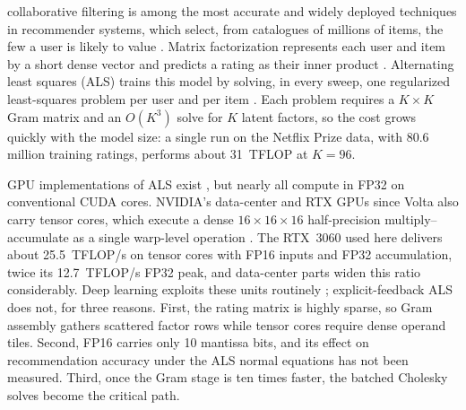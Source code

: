 
 collaborative filtering is among the most accurate and widely deployed techniques in recommender systems, which select, from catalogues of millions of items, the few a user is likely to value \cite{gomez2016netflix,schafer2001ecommerce}. Matrix factorization represents each user and item by a short dense vector and predicts a rating as their inner product \cite{koren2009matrix,bennett2007netflix}. Alternating least squares (ALS) trains this model by solving, in every sweep, one regularized least-squares problem per user and per item \cite{zhou2008largescale}. Each problem requires a $K \times K$ Gram matrix and an $O(K^{3})$ solve for $K$ latent factors, so the cost grows quickly with the model size: a single run on the Netflix Prize data, with 80.6 million training ratings, performs about 31~TFLOP at $K=96$.

GPU implementations of ALS exist \cite{tan2016faster,gates2015accelerating,chen2021bals}, but nearly all compute in FP32 on conventional CUDA cores. NVIDIA's data-center and RTX GPUs since Volta also carry tensor cores, which execute a dense $16 \times 16 \times 16$ half-precision multiply--accumulate as a single warp-level operation \cite{markidis2018nvidia}. The RTX~3060 used here delivers about 25.5~TFLOP/s on tensor cores with FP16 inputs and FP32 accumulation, twice its 12.7~TFLOP/s FP32 peak, and data-center parts widen this ratio considerably. Deep learning exploits these units routinely \cite{micikevicius2018mixed}; explicit-feedback ALS does not, for three reasons. First, the rating matrix is highly sparse, so Gram assembly gathers scattered factor rows while tensor cores require dense operand tiles. Second, FP16 carries only 10 mantissa bits, and its effect on recommendation accuracy under the ALS normal equations has not been measured. Third, once the Gram stage is ten times faster, the batched Cholesky solves become the critical path.

